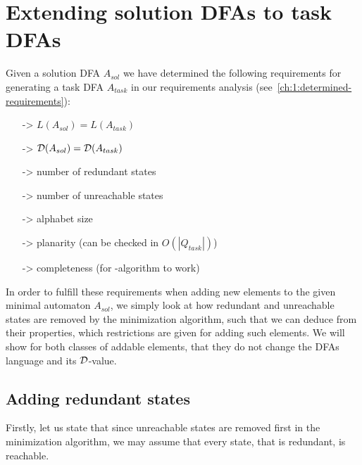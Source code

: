 
\chapter{Extending solution DFAs to task DFAs} \label{ch:3}

Given a solution DFA $A_{sol}$ we have determined the following requirements for generating a task DFA $A_{task}$ in our requirements analysis (see~\ref{ch:1:determined-requirements}):
\begin{itemize}
	\item[->] $L(A_{sol}) = L(A_{task})$
	\item[->] $\mathcal{D}(A_{sol}) = \mathcal{D}(A_{task})$
	\item[->] number of redundant states
	\item[->] number of unreachable states
	\item[->] alphabet size
	\item[->] planarity (can be checked in $O(|Q_{task}|)$)
	\item[->] completeness (for \CompDist-algorithm to work)
\end{itemize}
In order to fulfill these requirements when adding new elements to the given minimal automaton $A_{sol}$, we simply look at how redundant and unreachable states are removed by the minimization algorithm, such that we can deduce from their properties, which restrictions are given for adding such elements. We will show for both classes of addable elements, that they do not change the DFAs language and its $\mathcal{D}$-value.


\section{Adding redundant states}

Firstly, let us state that since unreachable states are removed first in the minimization algorithm, we may assume that every state, that is redundant, is reachable.


